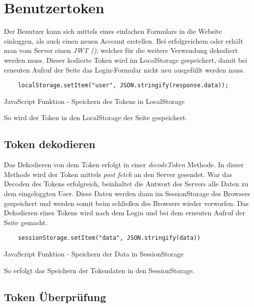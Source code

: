 \section{Benutzertoken}
\label{benutzer}

Der Benutzer kann sich mittels eines einfachen Formulars in die Website einloggen, als auch einen neuen 
Account erstellen. Bei erfolgreichem \underline{} oder \underline{} erhält man vom Server einen 
\textit{JWT (\underline{})}, welcher für die weitere Verwendung dekodiert werden muss. Dieser kodierte 
Token wird im LocalStorage gespeichert, damit bei erneuten Aufruf der Seite das Login-Formular nicht neu 
ausgefüllt werden muss.
\begin{code}[htp]
\begin{lstlisting}
    localStorage.setItem("user", JSON.stringify(response.data));
\end{lstlisting}
\caption{JavaScript Funktion - Speichern des Tokens in LocalStorage}
\end{code}
So wird der Token in den LocalStorage der Seite gespeichert.
\subsection{Token dekodieren}

Das Dekodieren von dem Token erfolgt in einer \textit{decodeToken} Methode. In dieser Methode wird der 
Token mittels \textit{post fetch} an den Server gesendet. War das Decoden des Tokens erfolgreich, 
beinhaltet die Antwort des Servers alle Daten zu dem eingeloggten User. Diese Daten werden dann im 
SessionStorage des Browsers gespeichert und werden somit beim schließen des Browsers wieder verworfen. 
Das Dekodieren eines Tokens wird nach dem Login und bei dem erneuten Aufruf der Seite gemacht.
\begin{code}[htp]
\begin{lstlisting}
    sessionStorage.setItem("data", JSON.stringify(data))
\end{lstlisting}
\caption{JavaScript Funktion - Speichern der Data in SessionStorage}
\end{code}

So erfolgt das Speichern der Tokendaten in den SessionStorage.

\subsection{Token Überprüfung}


